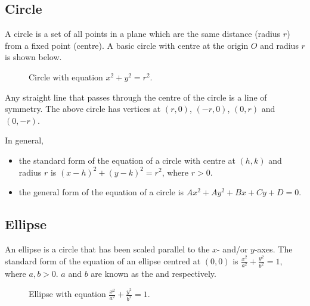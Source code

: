 \subsection{Circle}

A circle is a set of all points in a plane which are the same distance (radius $r$) from a fixed point (centre). A basic circle with centre at the origin $O$ and radius $r$ is shown below.

\begin{figure}[H]
    \centering
    \caption{Circle with equation $x^2 + y^2 = r^2$.}
\end{figure}

Any straight line that passes through the centre of the circle is a line of symmetry. The above circle has vertices at $(r, 0)$, $(-r, 0)$, $(0, r)$ and $(0, -r)$.

In general,
\begin{itemize}
    \item the standard form of the equation of a circle with centre at $(h, k)$ and radius $r$ is $(x-h)^2 + (y-k)^2 = r^2$, where $r > 0$.
    \item the general form of the equation of a circle is $Ax^2 + Ay^2 + Bx + Cy + D = 0$.
\end{itemize}

\subsection{Ellipse}

An ellipse is a circle that has been scaled parallel to the $x$- and/or $y$-axes. The standard form of the equation of an ellipse centred at $(0, 0)$ is $\frac{x^2}{a^2} + \frac{y^2}{b^2} = 1$, where $a, b > 0$. $a$ and $b$ are known as the  and  respectively.

\begin{figure}[H]
    \centering
    \caption{Ellipse with equation $\frac{x^2}{a^2} + \frac{y^2}{b^2} = 1$.}
\end{figure}

